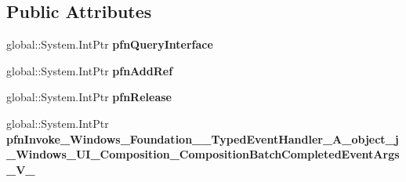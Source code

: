 \subsection*{Public Attributes}
\begin{DoxyCompactItemize}
\item 
\mbox{\label{struct_windows_1_1_foundation_1_1_typed_event_handler___a___system___object__j___windows___u_i__c6631eed6bac8896fe4382b061b4296d_ace7e64a98592bcf1486647b00f6d7a3b}} 
global\+::\+System.\+Int\+Ptr {\bfseries pfn\+Query\+Interface}
\item 
\mbox{\label{struct_windows_1_1_foundation_1_1_typed_event_handler___a___system___object__j___windows___u_i__c6631eed6bac8896fe4382b061b4296d_a838f8a6ea51ebb3de09973dde5c623fd}} 
global\+::\+System.\+Int\+Ptr {\bfseries pfn\+Add\+Ref}
\item 
\mbox{\label{struct_windows_1_1_foundation_1_1_typed_event_handler___a___system___object__j___windows___u_i__c6631eed6bac8896fe4382b061b4296d_aee1f82b7d61c8d28155249f8c848c6d4}} 
global\+::\+System.\+Int\+Ptr {\bfseries pfn\+Release}
\item 
\mbox{\label{struct_windows_1_1_foundation_1_1_typed_event_handler___a___system___object__j___windows___u_i__c6631eed6bac8896fe4382b061b4296d_aef8cbbc158a57d168fdb74b87fa751c2}} 
global\+::\+System.\+Int\+Ptr {\bfseries pfn\+Invoke\+\_\+\+Windows\+\_\+\+Foundation\+\_\+\+\_\+\+Typed\+Event\+Handler\+\_\+\+A\+\_\+object\+\_\+j\+\_\+\+Windows\+\_\+\+U\+I\+\_\+\+Composition\+\_\+\+Composition\+Batch\+Completed\+Event\+Args\+\_\+\+V\+\_\+}
\end{DoxyCompactItemize}
